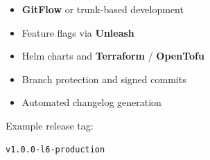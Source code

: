 \documentclass{article}
\begin{document}
\begin{itemize}[leftmargin=*]
  \item \textbf{GitFlow} or trunk-based development
  \item Feature flags via \textbf{Unleash}
  \item Helm charts and \textbf{Terraform} / \textbf{OpenTofu}
  \item Branch protection and signed commits
  \item Automated changelog generation
\end{itemize}

Example release tag:

\begin{lstlisting}
v1.0.0-l6-production
\end{lstlisting}
\end{document}
